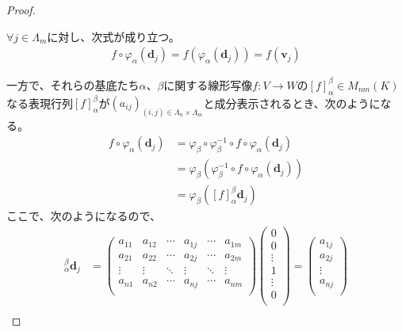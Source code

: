 \documentclass[dvipdfmx]{jsarticle}
\begin{document}
\begin{proof}
\begin{center}
\begin{tikzpicture}[auto]
    \end{tikzpicture} 
\end{center}
$\forall j \in \varLambda_{m}$に対し、次式が成り立つ。
\begin{align*}
f \circ \varphi_{\alpha}\left( \mathbf{d}_{j} \right) = f\left( \varphi_{\alpha}\left( \mathbf{d}_{j} \right) \right) = f\left( \mathbf{v}_{j} \right)
\end{align*}\par
一方で、それらの基底たち$\alpha$、$\beta$に関する線形写像$f:V \rightarrow W$の$[ f]^{\beta}_{\alpha} \in M_{nm}(K)$なる表現行列$[ f]^{\beta}_{\alpha}$が$\left( a_{ij} \right)_{(i,j) \in \varLambda_{n} \times \varLambda_{m}}$と成分表示されるとき、次のようになる。
\begin{align*}
f \circ \varphi_{\alpha}\left( \mathbf{d}_{j} \right) &= \varphi_{\beta} \circ \varphi_{\beta}^{- 1} \circ f \circ \varphi_{\alpha}\left( \mathbf{d}_{j} \right)\\
&= \varphi_{\beta}\left( \varphi_{\beta}^{- 1} \circ f \circ \varphi_{\alpha}\left( \mathbf{d}_{j} \right) \right)\\
&= \varphi_{\beta}\left( [ f]^{\beta}_{\alpha}\mathbf{d}_{j} \right)
\end{align*}
ここで、次のようになるので、
\begin{align*}
[ f]^{\beta}_{\alpha}\mathbf{d}_{j} &= \begin{pmatrix}
a_{11} & a_{12} & \cdots & a_{1j} & \cdots & a_{1m} \\
a_{21} & a_{22} & \cdots & a_{2j} & \cdots & a_{2m} \\
 \vdots & \vdots & \ddots & \vdots & \ddots & \vdots \\
a_{n1} & a_{n2} & \cdots & a_{nj} & \cdots & a_{nm} \\
\end{pmatrix}\begin{pmatrix}
0 \\
0 \\
 \vdots \\
1 \\
 \vdots \\
0 \\
\end{pmatrix} = \begin{pmatrix}
a_{1j} \\
a_{2j} \\
 \vdots \\
a_{nj} \\
\end{pmatrix}\\

\end{align*}
\end{proof}
\end{document}
